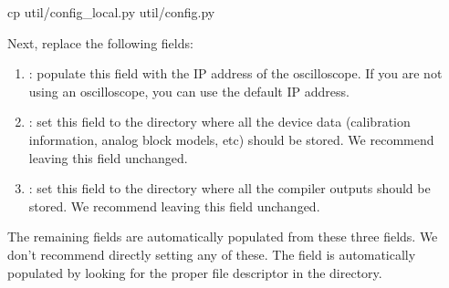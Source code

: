 \begin{snippet}
cp util/config_local.py util/config.py
\end{snippet}

Next, replace the following fields:

\begin{enumerate}
\item {}: populate this field with the IP address of the oscilloscope.
  If you are not using an oscilloscope, you can use the default IP address.
\item{}: set this field to the directory where all the device
  data (calibration information, analog block models, etc) should be stored. We
  recommend leaving this field unchanged.
\item{}: set this field to the directory where all the compiler
  outputs should be stored. We recommend leaving this field unchanged.
\end{enumerate}

The remaining fields are automatically populated from these three fields. We
don't recommend directly setting any of these. The  field
is automatically populated by looking for the proper file descriptor in the
 directory. 